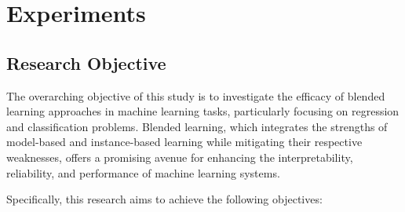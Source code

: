 \documentclass[a4paper, 12pt]{report}
\begin{document}
\chapter{Experiments}
\label{ch:Experiments}
\section{Research Objective}

The overarching objective of this study is to investigate the efficacy of blended learning approaches in machine learning tasks, 
particularly focusing on regression and classification problems. Blended learning, which integrates the strengths of model-based and instance-based learning while mitigating their respective weaknesses, 
offers a promising avenue for enhancing the interpretability, reliability, and performance of machine learning systems.

Specifically, this research aims to achieve the following objectives:
\end{document}
